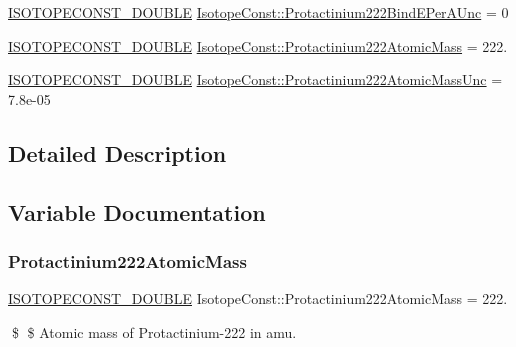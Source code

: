 \begin{DoxyCompactItemize}
\item 
\mbox{\hyperlink{group___isotope_const-_macros_ga8f45a7272ce02c0b4c65c44636ed719a}{I\+S\+O\+T\+O\+P\+E\+C\+O\+N\+S\+T\+\_\+\+D\+O\+U\+B\+LE}} \mbox{\hyperlink{group___isotope_const-_protactinium-_pa222_ga5a318d58399974fe66be484c2c52d088}{Isotope\+Const\+::\+Protactinium222\+Bind\+E\+Per\+A\+Unc}} = 0
\item 
\mbox{\hyperlink{group___isotope_const-_macros_ga8f45a7272ce02c0b4c65c44636ed719a}{I\+S\+O\+T\+O\+P\+E\+C\+O\+N\+S\+T\+\_\+\+D\+O\+U\+B\+LE}} \mbox{\hyperlink{group___isotope_const-_protactinium-_pa222_gafdd49503641380f75c3d80387285d418}{Isotope\+Const\+::\+Protactinium222\+Atomic\+Mass}} = 222.
\item 
\mbox{\hyperlink{group___isotope_const-_macros_ga8f45a7272ce02c0b4c65c44636ed719a}{I\+S\+O\+T\+O\+P\+E\+C\+O\+N\+S\+T\+\_\+\+D\+O\+U\+B\+LE}} \mbox{\hyperlink{group___isotope_const-_protactinium-_pa222_gaff3213f9d9557a7d6790ef13538a6aea}{Isotope\+Const\+::\+Protactinium222\+Atomic\+Mass\+Unc}} = 7.\+8e-\/05
\end{DoxyCompactItemize}


\subsection{Detailed Description}


\subsection{Variable Documentation}
\mbox{\label{group___isotope_const-_protactinium-_pa222_gafdd49503641380f75c3d80387285d418}} 
\subsubsection{\texorpdfstring{Protactinium222\+Atomic\+Mass}{Protactinium222AtomicMass}}
{\footnotesize\ttfamily \mbox{\hyperlink{group___isotope_const-_macros_ga8f45a7272ce02c0b4c65c44636ed719a}{I\+S\+O\+T\+O\+P\+E\+C\+O\+N\+S\+T\+\_\+\+D\+O\+U\+B\+LE}} Isotope\+Const\+::\+Protactinium222\+Atomic\+Mass = 222.}

\$ \$ Atomic mass of Protactinium-\/222 in amu. \mbox{\label{group___isotope_const-_protactinium-_pa222_gaff3213f9d9557a7d6790ef13538a6aea}} 
